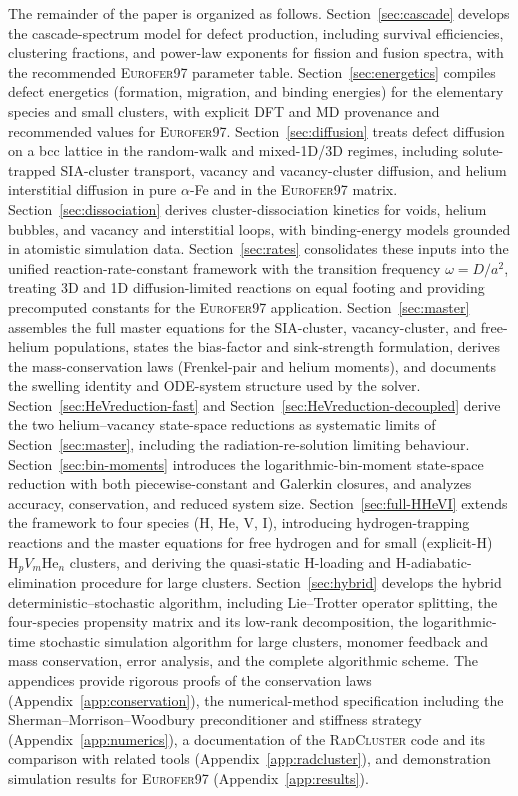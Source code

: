 \documentclass[sn-mathphys-ay,Numbered]{sn-jnl}
\begin{document}
The remainder of the paper is organized as follows.
Section~\ref{sec:cascade} develops the cascade-spectrum model for
defect production, including survival efficiencies, clustering
fractions, and power-law exponents for fission and fusion spectra,
with the recommended \textsc{Eurofer97} parameter table.
Section~\ref{sec:energetics} compiles defect energetics
(formation, migration, and binding energies) for the elementary
species and small clusters, with explicit DFT and MD provenance and
recommended values for \textsc{Eurofer97}.
Section~\ref{sec:diffusion} treats defect diffusion on a bcc lattice
in the random-walk and mixed-1D/3D regimes, including solute-trapped
SIA-cluster transport, vacancy and vacancy-cluster diffusion, and
helium interstitial diffusion in pure $\alpha$-Fe and in the
\textsc{Eurofer97} matrix.
Section~\ref{sec:dissociation} derives cluster-dissociation kinetics
for voids, helium bubbles, and vacancy and interstitial loops, with
binding-energy models grounded in atomistic simulation data.
Section~\ref{sec:rates} consolidates these inputs into the unified
reaction-rate-constant framework with the transition frequency
$\omega = D/a^{2}$, treating 3D and 1D diffusion-limited reactions
on equal footing and providing precomputed constants for the
\textsc{Eurofer97} application.
Section~\ref{sec:master} assembles the full master equations for
the SIA-cluster, vacancy-cluster, and free-helium populations,
states the bias-factor and sink-strength formulation, derives the
mass-conservation laws (Frenkel-pair and helium moments), and
documents the swelling identity and ODE-system structure used by
the solver.
Section~\ref{sec:HeVreduction-fast} and
Section~\ref{sec:HeVreduction-decoupled} derive the two
helium--vacancy state-space reductions as systematic limits of
Section~\ref{sec:master}, including the radiation-re-solution
limiting behaviour.
Section~\ref{sec:bin-moments} introduces the logarithmic-bin-moment
state-space reduction with both piecewise-constant and Galerkin
closures, and analyzes accuracy, conservation, and reduced system
size.
Section~\ref{sec:full-HHeVI} extends the framework to four
species (H, He, V, I), introducing hydrogen-trapping reactions and
the master equations for free hydrogen and for small (explicit-H)
$\mathrm{H}_{p}V_{m}\mathrm{He}_{n}$ clusters, and deriving the
quasi-static H-loading and H-adiabatic-elimination procedure for
large clusters.
Section~\ref{sec:hybrid} develops the hybrid deterministic--stochastic
algorithm, including Lie--Trotter operator splitting, the four-species
propensity matrix and its low-rank decomposition, the logarithmic-time
stochastic simulation algorithm for large clusters, monomer feedback
and mass conservation, error analysis, and the complete algorithmic
scheme.
The appendices provide rigorous proofs of the conservation laws
(Appendix~\ref{app:conservation}), the numerical-method specification
including the Sherman--Morrison--Woodbury preconditioner and stiffness
strategy (Appendix~\ref{app:numerics}), a documentation of the
\textsc{RadCluster} code and its comparison with related tools
(Appendix~\ref{app:radcluster}), and demonstration simulation results
for \textsc{Eurofer97} (Appendix~\ref{app:results}).
\end{document}
